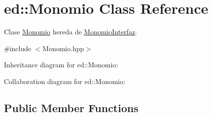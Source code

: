 \hypertarget{classed_1_1Monomio}{}\section{ed\+:\+:Monomio Class Reference}
\label{classed_1_1Monomio}


Clase \hyperlink{classed_1_1Monomio}{Monomio} hereda de \hyperlink{classed_1_1MonomioInterfaz}{Monomio\+Interfaz}.  




{\ttfamily \#include $<$Monomio.\+hpp$>$}



Inheritance diagram for ed\+:\+:Monomio\+:


Collaboration diagram for ed\+:\+:Monomio\+:
\subsection*{Public Member Functions}
